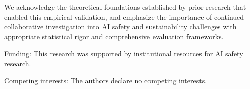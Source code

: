 \documentclass{article}
\begin{document}
\begin{ack}
We acknowledge the theoretical foundations established by prior research that enabled this empirical validation, and emphasize the importance of continued collaborative investigation into AI safety and sustainability challenges with appropriate statistical rigor and comprehensive evaluation frameworks.

Funding: This research was supported by institutional resources for AI safety research.

Competing interests: The authors declare no competing interests.
\end{ack}



\end{document}
